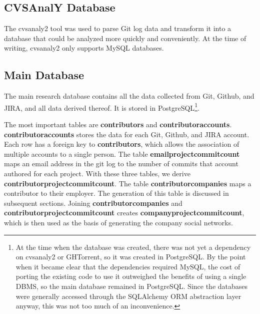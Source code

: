 \subsection{CVSAnalY Database}
The cvsanaly2 tool\cite{cvsanaly} was used to parse Git log data and transform it into a database that could be analyzed more quickly and conveniently. At the time of writing, cvsanaly2 only supports MySQL databases.
\subsection{Main Database}
The main research database contains all the data collected from Git, Github, and JIRA, and all data derived thereof. It is stored in PostgreSQL\footnote{At the time when the database was created, there was not yet a dependency on cvsanaly2 or GHTorrent, so it was created in PostgreSQL. By the point when it became clear that the dependencies required MySQL, the cost of porting the existing code to use it outweighed the benefits of using a single DBMS, so the main database remained in PostgreSQL. Since the databases were generally accessed through the SQLAlchemy ORM abstraction layer anyway, this was not too much of an inconvenience.}.

The most important tables are \textbf{contributors} and \textbf{contributoraccounts}. \textbf{contributoraccounts} stores the data for each Git, Github, and JIRA account. Each row has a foreign key to \textbf{contributors}, which allows the association of multiple accounts to a single person. The table \textbf{emailprojectcommitcount} maps an email address in the git log to the number of commits that account authored for each project. With these three tables, we derive \textbf{contributorprojectcommitcount}. The table \textbf{contributorcompanies} maps a contributor to their employer. The generation of this table is discussed in subsequent sections. Joining \textbf{contributorcompanies} and \textbf{contributorprojectcommitcount} creates \textbf{companyprojectcommitcount}, which is then used as the basis of generating the company social networks.

